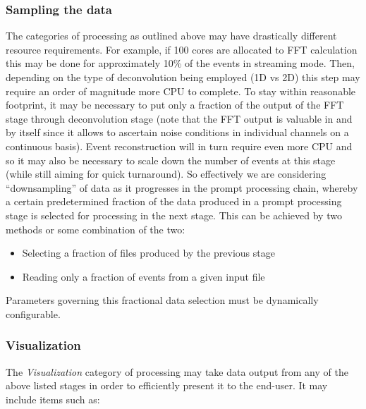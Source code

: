 \documentclass[pdftex,12pt,letter]{article}
\begin{document}
\subsubsection{Sampling the data}
\label{sec:downsampling}
The categories of processing as outlined above may have drastically different resource requirements.
For example, if 100 cores are allocated to FFT calculation this may be done for approximately 10\% of the events
in streaming mode. Then, depending on the type of deconvolution being employed (1D vs 2D) this step
may require an order of magnitude more CPU to complete. To stay within reasonable footprint,
it may be necessary to put only a fraction of the output of the FFT stage through deconvolution stage
(note that the FFT output is valuable in and by itself since it allows to ascertain noise conditions in individual channels
on a continuous basis). Event reconstruction will in turn require even more CPU
and so it may also be necessary to scale down the number of
events at this stage (while still aiming for quick turnaround). So effectively we are considering ``downsampling''
of data as it progresses in the prompt processing chain, whereby a certain predetermined fraction of the data
produced in a prompt processing stage is selected for processing in the next stage.
This can be achieved by two methods or some combination of the two:
\begin{itemize}
\item Selecting a fraction of files produced by the previous stage
\item Reading only a fraction of events from a given input file
\end{itemize}

\noindent Parameters governing this fractional data selection must be dynamically configurable.


\subsubsection{Visualization}
\label{sec:viz_intro}

The \textit{Visualization} category of processing
 may take data output from any of the above listed stages in
order to efficiently present it to the end-user. 
It may include items such as:
\end{document}
